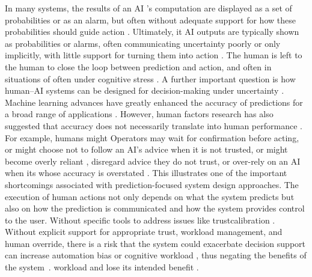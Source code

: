 \documentclass[journal]{IEEEtran}
\theoremstyle{plain}
\theoremstyle{definition}
\providecommand{\DIFaddtex}[1]{{\protect\color{blue} \sf #1}} %
\providecommand{\DIFdeltex}[1]{{\protect\color{red} \scriptsize #1}} %
\providecommand{\DIFaddbegin}{} %
\providecommand{\DIFaddend}{} %
\providecommand{\DIFdelbegin}{} %
\providecommand{\DIFdelend}{} %
\providecommand{\DIFadd}[1]{\texorpdfstring{\DIFaddtex{#1}}{#1}} %
\providecommand{\DIFdel}[1]{\texorpdfstring{\DIFdeltex{#1}}{}} %
\newcommand{\DIFscaledelfig}{0.5}
\newlength{\DIFdelgraphicswidth} %
\newlength{\DIFdelgraphicsheight} %
\newcommand{\DIFaddincludegraphics}[2][]{{\color{blue}\fbox{\DIFOincludegraphics[#1]{#2}}}} %
\newcommand{\DIFdelincludegraphics}[2][]{%
\sbox{\DIFdelgraphicsbox}{\DIFOincludegraphics[#1]{#2}}%
\settoboxwidth{\DIFdelgraphicswidth}{\DIFdelgraphicsbox} %
\settoboxtotalheight{\DIFdelgraphicsheight}{\DIFdelgraphicsbox} %
\scalebox{\DIFscaledelfig}{%
\parbox[b]{\DIFdelgraphicswidth}{\usebox{\DIFdelgraphicsbox}\\[-\baselineskip] \rule{\DIFdelgraphicswidth}{0em}}\llap{\resizebox{\DIFdelgraphicswidth}{\DIFdelgraphicsheight}{%
\setlength{\unitlength}{\DIFdelgraphicswidth}%
\begin{picture}(1,1)%
\thicklines\linethickness{2pt} %
{\color[rgb]{1,0,0}\put(0,0){\framebox(1,1){}}}%
{\color[rgb]{1,0,0}\put(0,0){\line( 1,1){1}}}%
{\color[rgb]{1,0,0}\put(0,1){\line(1,-1){1}}}%
\end{picture}%
}\hspace*{3pt}}} %
} %
\DeclareRobustCommand{\DIFaddbegin}{\DIFOaddbegin \let\includegraphics\DIFaddincludegraphics} %
\DeclareRobustCommand{\DIFaddend}{\DIFOaddend \let\includegraphics\DIFOincludegraphics} %
\DeclareRobustCommand{\DIFdelbegin}{\DIFOdelbegin \let\includegraphics\DIFdelincludegraphics} %
\DeclareRobustCommand{\DIFdelend}{\DIFOaddend \let\includegraphics\DIFOincludegraphics} %
\begin{document}
\DIFdelbegin \DIFdel{In many systems, the results of an AI 's computation are displayed as a set of probabilities or as an alarm, but often without adequate support for how these probabilities should guide action \cite{Miller2019XRDS,Bach2024Access}. Ultimately, it }\DIFdelend \DIFaddbegin \DIFadd{AI outputs are typically shown as probabilities or alarms, often communicating uncertainty poorly or only implicitly, with little support for turning them into action \cite{Weidinger2022FAccT,Miller2019XRDS,Bach2024Access}. The human }\DIFaddend is left to \DIFdelbegin \DIFdel{the human to }\DIFdelend close the loop between prediction and action, \DIFdelbegin \DIFdel{and often in situations of }\DIFdelend \DIFaddbegin \DIFadd{often under }\DIFaddend cognitive stress \cite{Hodgson2013THMS,Zhang2022THMS}. \DIFdelbegin \DIFdel{A further important question is how human--AI systems can be designed for decision-making under uncertainty \cite{Lai2023FAccT}.
Machine learning advances have greatly enhanced the accuracy of predictions for a broad range of applications \cite{Mai2024TOS,PerezCerrolaza2024CSUR}. However, human factors research has also suggested that accuracy does not necessarily translate into human performance \cite{Lai2023FAccT,Yang2022THMSReview}. For example, humans might }\DIFdelend \DIFaddbegin \DIFadd{Operators may }\DIFaddend wait for confirmation\DIFdelbegin \DIFdel{before acting, or might choose not to follow an AI's advice when it is not trusted, or might become overly reliant }\DIFdelend \DIFaddbegin \DIFadd{, disregard advice they do not trust, or over-rely }\DIFaddend on an AI \DIFdelbegin \DIFdel{when its }\DIFdelend \DIFaddbegin \DIFadd{whose }\DIFaddend accuracy is overstated \DIFdelbegin \DIFdel{\cite{Hodgson2013THMS,Raji2019AIES,Raji2022CACM}.
This illustrates one of the important shortcomings associated with prediction-focused system design approaches. The execution of human actions not only depends on what the system predicts but also on how the prediction is communicated and how the system provides control to the user. Without specific tools to address issues like trustcalibration}\DIFdelend \DIFaddbegin \DIFadd{\cite{Hodgson2013THMS,Raji2019AIES,Raji2022CACM,Parasuraman2010}. Without explicit support for appropriate trust}\DIFaddend , workload management, and human override, \DIFdelbegin \DIFdel{there is a risk that the system could exacerbate }\DIFdelend \DIFaddbegin \DIFadd{decision support can increase }\DIFaddend automation bias or \DIFdelbegin \DIFdel{cognitive workload , thus negating the benefits of the system~\cite{Duan2014KDD,Hodgson2013THMS,Zhang2022THMS,Bach2024Access}. }\DIFdelend \DIFaddbegin \DIFadd{workload and lose its intended benefit \cite{Zhang2022THMS,Bach2024Access,Lee2004}.
}\DIFaddend 
\end{document}
